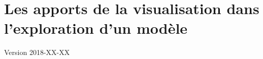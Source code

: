 \documentclass[12pt, a4paper, oneside]{book}
\begin{document}
	\setcounter{part}{1}
	\setcounter{chapter}{5}
	\setcounter{secnumdepth}{4}
		
	\chapter{Les apports de la visualisation dans l'exploration d'un modèle}
	\begin{center}
		{\large Version 2018-XX-XX}
	\end{center}

	
\end{document}
